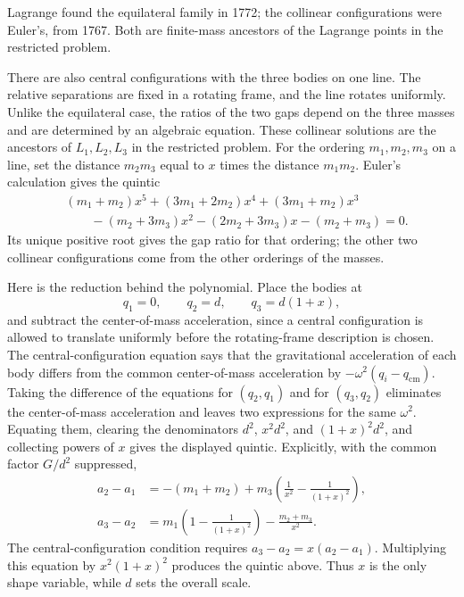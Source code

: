 Lagrange found the equilateral family in 1772; the collinear configurations
were Euler's, from 1767. Both are finite-mass ancestors of the Lagrange points
in the restricted problem.

\begin{example}
There are also central configurations with the three bodies on one line. The
relative separations are fixed in a rotating frame, and the line rotates
uniformly. Unlike the equilateral case, the ratios of the two gaps depend on
the three masses and are determined by an algebraic equation. These collinear
solutions are the ancestors of \(L_1,L_2,L_3\) in the restricted problem.
For the ordering \(m_1,m_2,m_3\) on a line, set the distance \(m_2m_3\) equal
to \(x\) times the distance \(m_1m_2\). Euler's calculation gives the quintic
\[
\begin{aligned}
 &(m_1+m_2)x^5+(3m_1+2m_2)x^4+(3m_1+m_2)x^3\\
 &\qquad -(m_2+3m_3)x^2-(2m_2+3m_3)x-(m_2+m_3)=0.
\end{aligned}
\]
Its unique positive root gives the gap ratio for that ordering; the other two
collinear configurations come from the other orderings of the masses.

Here is the reduction behind the polynomial. Place the bodies at
\[
  q_1=0,\qquad q_2=d,\qquad q_3=d(1+x),
\]
and subtract the center-of-mass acceleration, since a central configuration is
allowed to translate uniformly before the rotating-frame description is chosen.
The central-configuration equation says that the gravitational acceleration of
each body differs from the common center-of-mass acceleration by
\(-\omega^2(q_i-q_{\mathrm{cm}})\). Taking the difference of the equations for
\((q_2,q_1)\) and for \((q_3,q_2)\) eliminates the center-of-mass acceleration
and leaves two expressions for the same \(\omega^2\). Equating them, clearing
the denominators \(d^2\), \(x^2d^2\), and \((1+x)^2d^2\), and collecting powers
of \(x\) gives the displayed quintic. Explicitly, with the common factor
\(G/d^2\) suppressed,
\[
\begin{aligned}
  a_2-a_1
  &=
  -(m_1+m_2)
  +m_3\left(\frac1{x^2}-\frac1{(1+x)^2}\right),\\
  a_3-a_2
  &=
  m_1\left(1-\frac1{(1+x)^2}\right)
  -\frac{m_2+m_3}{x^2}.
\end{aligned}
\]
The central-configuration condition requires \(a_3-a_2=x(a_2-a_1)\). Multiplying
this equation by \(x^2(1+x)^2\) produces the quintic above. Thus \(x\) is the
only shape variable, while \(d\) sets the overall scale.
\end{example}

